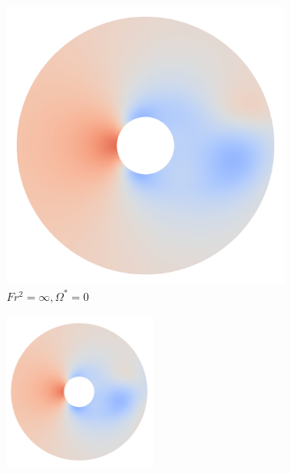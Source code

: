 \begin{figure}   
    \centering
        \begin{subfigure}[b]{0.25\textwidth}
        \centering
        \includegraphics[width=\textwidth]{images/circle/ps0fsinf.png}
        \caption{$Fr^2 = \infty, \Omega^{\ast} = 0$}
        \label{fig:ps0fsinf}
    \end{subfigure}
    \hfill
    \begin{subfigure}[b]{0.25\textwidth}
        \centering
        \includegraphics[width=\textwidth]{images/circle/ps0fs100.png}

\end{subfigure}
\end{figure}

